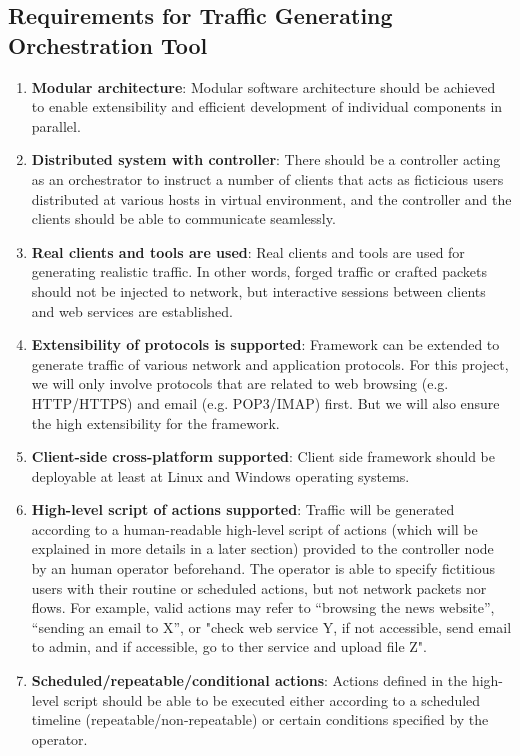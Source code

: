 \documentclass[12pt]{report}
\begin{document}
\subsection{Requirements for Traffic Generating Orchestration Tool}
\begin{enumerate}
\item \textbf{Modular architecture}: Modular software architecture should be achieved to enable extensibility and efficient development of individual components in parallel.
\item \textbf{Distributed system with controller}: There should be a controller acting as an orchestrator to instruct a number of clients that acts as ficticious users distributed at various hosts in virtual environment, and the controller and the clients should be able to communicate seamlessly.
\item \textbf{Real clients and tools are used}: Real clients and tools are used for generating realistic traffic. In other words, forged traffic or crafted packets should not be injected to network, but interactive sessions between clients and web services are established.
\item \textbf{Extensibility of protocols is supported}: Framework can be extended to generate traffic of various network and application protocols. For this project, we will only involve protocols that are related to web browsing (e.g. HTTP/HTTPS) and email (e.g. POP3/IMAP) first. But we will also ensure the high extensibility for the framework.
\item \textbf{Client-side cross-platform supported}: Client side framework should be deployable at least at Linux and Windows operating systems.
\item \textbf{High-level script of actions supported}: Traffic will be generated according to a human-readable high-level script of actions (which will be explained in more details in a later section) provided to the controller node by an human operator beforehand. The operator is able to specify fictitious users with their routine or scheduled actions, but not network packets nor flows. For example, valid actions may refer to “browsing the news website”, “sending an email to X”, or "check web service Y, if not accessible, send email to admin, and if accessible, go to ther service and upload file Z".
\item \textbf{Scheduled/repeatable/conditional actions}: Actions defined in the high-level script should be able to be executed either according to a scheduled timeline (repeatable/non-repeatable) or certain conditions specified by the operator.

\end{enumerate}
\end{document}
